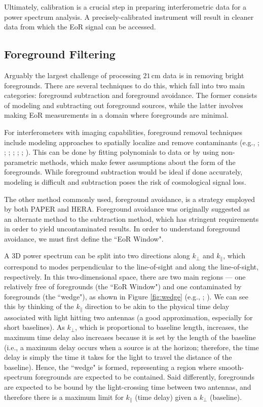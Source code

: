 Ultimately, calibration is a crucial step in preparing interferometric data for a power spectrum analysis. A precisely-calibrated instrument will result in cleaner data from which the EoR signal can be accessed.

\subsection{Foreground Filtering}
\label{sec:fg_intro}

Arguably the largest challenge of processing $21$\,cm data is in removing bright foregrounds. There are several techniques to do this, which fall into two main categories: foreground subtraction and foreground avoidance. The former consists of modeling and subtracting out foreground sources, while the latter involves making EoR measurements in a domain where foregrounds are minimal. 

For interferometers with imaging capabilities, foreground removal techniques include modeling approaches to spatially localize and remove contaminants (e.g., \citealt{santos_et_al2005}; \citealt{wang_et_al2006}; \citealt{jelic_et_al2008}; \citealt{liu_et_al2009}; \citealt{bowman_et_al2009}; \citealt{harker_et_al2009}; \citealt{chapman_et_al2016}). This can be done by fitting polynomials to data or by using non-parametric methods, which make fewer assumptions about the form of the foregrounds. While foreground subtraction would be ideal if done accurately, modeling is difficult and subtraction poses the risk of cosmological signal loss.

The other method commonly used, foreground avoidance, is a strategy employed by both PAPER and HERA. Foreground avoidance was originally suggested as an alternate method to the subtraction method, which has stringent requirements in order to yield uncontaminated results. In order to understand foreground avoidance, we must first define the ``EoR Window".

A 3D power spectrum can be split into two directions along $k_{\perp}$ and $k_{\parallel}$, which correspond to modes perpendicular to the line-of-sight and along the line-of-sight, respectively. In this two-dimensional space, there are two main regions --- one relatively free of foregrounds (the ``EoR Window") and one contaminated by foregrounds (the ``wedge"), as shown in Figure \ref{fig:wedge} (e.g., \citealt{datta_et_al2010}; \citealt{vedantham_et_al2012}). We can see this by thinking of the $k_{\parallel}$ direction to be akin to the physical time delay associated with light hitting two antennas (a good approximation, especially for short baselines). As $k_{\perp}$, which is proportional to baseline length, increases, the maximum time delay also increases because it is set by the length of the baseline (i.e., a maximum delay occurs when a source is at the horizon; therefore, the time delay is simply the time it takes for the light to travel the distance of the baseline). Hence, the ``wedge" is formed, representing a region where smooth-spectrum foregrounds are expected to be contained. Said differently, foregrounds are expected to be bound by the light-crossing time between two antennas, and therefore there is a maximum limit for $k_{\parallel}$ (time delay) given a $k_{\perp}$ (baseline). 

